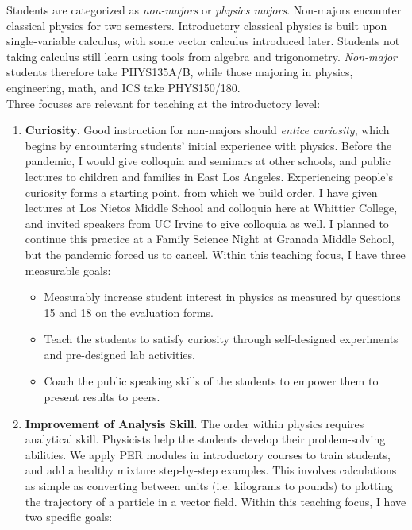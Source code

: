 \documentclass[../../../main.tex]{subfiles}
\begin{document}
Students are categorized as \textit{non-majors} or \textit{physics majors}.  Non-majors encounter classical physics for two semesters.  Introductory classical physics is built upon single-variable calculus, with some vector calculus introduced later.  Students not taking calculus still learn using tools from algebra and trigonometry.  \textit{Non-major} students therefore take PHYS135A/B, while those majoring in physics, engineering, math, and ICS take PHYS150/180.
\\
\vspace{0.15cm}
Three focuses are relevant for teaching at the introductory level:
\begin{enumerate}
\item \textbf{Curiosity}.  Good instruction for non-majors should \textit{entice curiosity}, which begins by encountering students' initial experience with physics.  Before the pandemic, I would give colloquia and seminars at other schools, and public lectures to children and families in East Los Angeles.  Experiencing people's curiosity forms a starting point, from which we build order.  I have given lectures at Los Nietos Middle School and colloquia here at Whittier College, and invited speakers from UC Irvine to give colloquia as well.  I planned to continue this practice at a Family Science Night at Granada Middle School, but the pandemic forced us to cancel.  Within this teaching focus, I have three measurable goals:

\begin{itemize}
\item Measurably increase student interest in physics as measured by questions 15 and 18 on the evaluation forms.
\item Teach the students to satisfy curiosity through self-designed experiments and pre-designed lab activities.
\item Coach the public speaking skills of the students to empower them to present results to peers.
\end{itemize}

\item \textbf{Improvement of Analysis Skill}.  The order within physics requires analytical skill.  Physicists help the students develop their problem-solving abilities.  We apply PER modules in introductory courses to train students, and add a healthy mixture step-by-step examples.  This involves calculations as simple as converting between units (i.e. kilograms to pounds) to plotting the trajectory of a particle in a vector field.  Within this teaching focus, I have two specific goals:


\end{enumerate}
\end{document}
